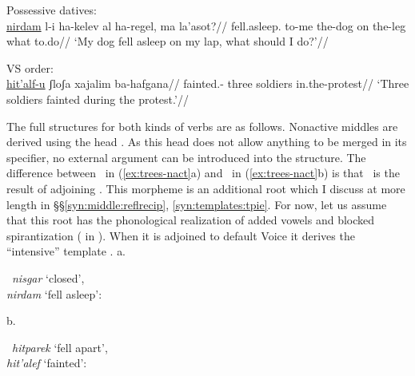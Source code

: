 \ex Possessive datives:\\
	\begingl
	\gla \underline{nirdam} l-i ha-kelev al ha-regel, ma la'asot?//
	\glb fell.asleep. to-me the-dog on the-leg what to.do//
	\glft `My dog fell asleep on my lap, what should I do?'//
	\endgl
\xe

\ex VS order:\\
	\begingl
	\gla \underline{hit'alf-u} ʃloʃa xajalim ba-hafgana//
	\glb fainted.- three soldiers in.the-protest//
	\glft `Three soldiers fainted during the protest.'//
	\endgl
\xe

The full structures for both kinds of verbs are as follows. Nonactive middles are derived using the head \vz. As this head does not allow anything to be merged in its specifier, no external argument can be introduced into the structure. The difference between \tnif~in (\ref{ex:trees-nact}a) and \thit~in (\ref{ex:trees-nact}b) is that \thit~is the result of {adjoining} . This morpheme is an additional root which I discuss at more length in \S\S\ref{syn:middle:reflrecip}, \ref{syn:templates:tpie}. For now, let us assume that this root has the phonological {realization} of {added} vowels and {blocked} spirantization ( in \thit). When it is adjoined to default Voice it derives the ``intensive'' template \tpie.
\ex \label{ex:trees-nact}
a. \begin{minipage}[t]{0.35\textwidth}
	{\textbf{\tnif}~\emph{nisgar} `closed',\\\emph{nirdam} `fell asleep':}\\
	\scalebox{1}{
 	}
\end{minipage}
\begin{minipage}[t]{0.05\textwidth}
	\phantom{asdf}
\end{minipage}
b. \begin{minipage}[t]{0.45\textwidth}
	{\textbf{\thit}~\emph{hitparek} `fell apart',\\\emph{hit'alef} `fainted':}\\
 	\scalebox{1}{
 	}
\end{minipage}
\xe

